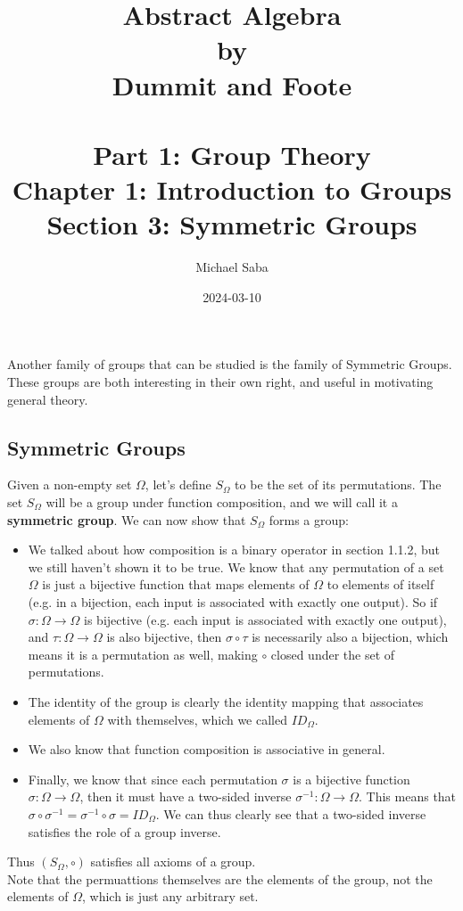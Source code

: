 \documentclass[12pt]{article}
\title{%
    \Huge Abstract Algebra \\
    \large by \\
    \Large Dummit and Foote \\~\\
    \huge Part 1: Group Theory \\
    \LARGE Chapter 1: Introduction to Groups \\
    \Large Section 3: Symmetric Groups
}
\date{2024-03-10}
\author{Michael Saba}
\begin{document}
    \maketitle
    \newpage
    \setlength{\parindent}{0pt}

    Another family of groups that can be studied
    is the family of Symmetric Groups. \\
    These groups are both interesting in their own right,
    and useful in motivating general theory. \\

    \subsection*{Symmetric Groups}

    Given a non-empty set $\Omega$,
    let's define $S_\Omega$ to be the set of its permutations.
    The set $S_\Omega$ will be a group under function composition,
    and we will call it a \textbf{symmetric group}.
    We can now show that $S_\Omega$ forms a group:
    \begin{itemize}[label=$\diamond$]
        \item 
            We talked about how composition is a binary operator
            in section 1.1.2, but we still haven't shown it to be true.
            We know that any permutation of a set $\Omega$
            is just a bijective function
            that maps elements of $\Omega$ to elements of itself
            (e.g. in a bijection,
            each input is associated with exactly one output).
            So if $\sigma: \Omega \rightarrow \Omega$ is bijective
            (e.g. each input is associated with exactly one output),
            and $\tau: \Omega \rightarrow \Omega$ is also bijective,
            then $\sigma \circ \tau$ is necessarily also a bijection,
            which means it is a permutation as well,
            making $\circ$ closed under the set of permutations.
        \item 
            The identity of the group is clearly the identity mapping
            that associates elements of $\Omega$ with themselves,
            which we called $ID_\Omega$.
        \item
            We also know that function composition is associative in general.
        \item
            Finally, we know that since each permutation $\sigma$
            is a bijective function  $\sigma: \Omega \rightarrow \Omega$, 
            then it must have a two-sided inverse
            $\sigma^{-1}: \Omega \rightarrow \Omega$.
            This means that
            $\sigma \circ \sigma^{-1} = \sigma^{-1} \circ \sigma = ID_\Omega$.
            We can thus clearly see that a two-sided inverse
            satisfies the role of a group inverse.

    \end{itemize}
    Thus $(S_\Omega, \circ)$ satisfies all axioms of a group. \\
    Note that the permuattions themselves are the elements 
    of the group,
    not the elements of $\Omega$, which is just any arbitrary set. \\
\end{document}
